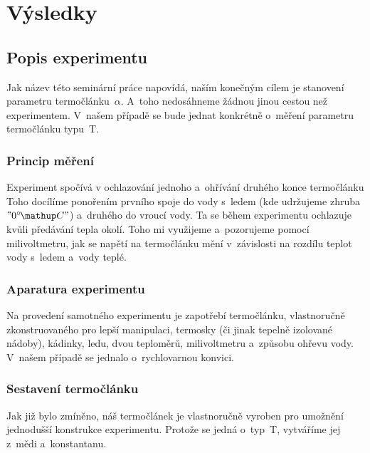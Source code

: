 
\section{Výsledky}
\subsection{Popis experimentu}
Jak název této seminární práce napovídá, naším konečným cílem je stanovení
parametru termočlánku~$\alpha$. A~toho nedosáhneme žádnou jinou cestou než
experimentem. V~našem případě se bude jednat konkrétně o~měření parametru
termočlánku typu~T.

\subsubsection{Princip měření}
Experiment spočívá v ochlazování jednoho a~ohřívání druhého konce termočlánku%
 Toho docílíme ponořením prvního
spoje do vody s~ledem (kde udržujeme zhruba~$"0 \C"$) a~druhého do vroucí vody.
Ta se během experimentu ochlazuje kvůli předávání tepla okolí. Toho mi
využijeme a~pozorujeme pomocí milivoltmetru, jak se napětí na termočlánku
mění v~závislosti na rozdílu teplot vody s~ledem a~vody teplé.

\subsubsection{Aparatura experimentu}
Na provedení samotného experimentu je zapotřebí termočlánku, vlastnoručně
zkonstruovaného pro lepší manipulaci, termosky (či jinak tepelně izolované
nádoby), kádinky, ledu, dvou teploměrů, milivoltmetru a~způsobu ohřevu vody.
V~našem případě se jednalo o~rychlovarnou konvici.

\subsubsection{Sestavení termočlánku}
Jak již bylo zmíněno, náš termočlánek je vlastnoručně vyroben pro umožnění
jednodušší konstrukce experimentu. Protože se jedná o~typ~T, vytváříme jej
z~mědi a~konstantanu. 

